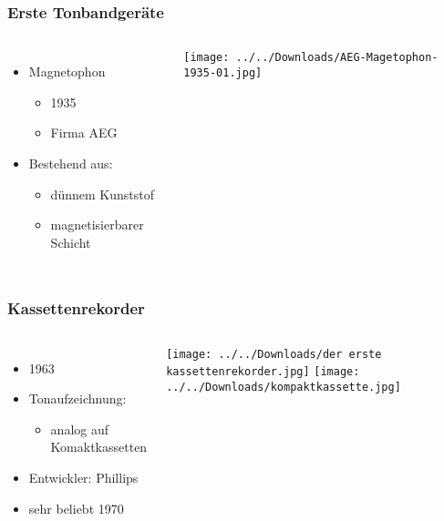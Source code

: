 \documentclass{beamer}
\begin{document}
\begin{frame}
\frametitle{Erste Tonbandgeräte}
\begin{columns}
	\begin{itemize}
		\Large		
		\item Magnetophon
		\begin{itemize}
			\item 1935
			\item Firma AEG
		\end{itemize}				
		\vspace{0.5cm}\item Bestehend aus:
		\begin{itemize}
			\item dünnem Kunststof
			\item magnetisierbarer Schicht
		\end{itemize}							
	\end{itemize}
		\texttt{[image: ../../Downloads/AEG-Magetophon-1935-01.jpg]} 
\end{columns}
\end{frame}

\begin{frame}
\frametitle{Kassettenrekorder}
\begin{columns}
	\begin{itemize}
		\Large		
		\item 1963		
		\vspace{0.5cm}\item Tonaufzeichnung:
			\begin{itemize}
				\item analog auf Komaktkassetten
			\end{itemize}
		\vspace{0.5cm}\item Entwickler: Phillips
		\vspace{0.5cm}\item sehr beliebt 1970							
	\end{itemize}
		\texttt{[image: ../../Downloads/der erste kassettenrekorder.jpg]}  
		\texttt{[image: ../../Downloads/kompaktkassette.jpg]} 
\end{columns}	
\end{frame}
\end{document}
